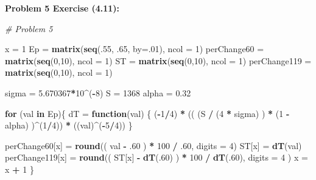 \documentclass[11pt]{article}
\newenvironment{problem}[1]{\textbf{Problem #1: }}{\newpage}
\newenvironment{Shaded}{\begin{snugshade}}{\end{snugshade}}
\newcommand{\CommentTok}[1]{\textcolor[rgb]{0.56,0.35,0.01}{\textit{#1}}}
\newcommand{\ControlFlowTok}[1]{\textcolor[rgb]{0.13,0.29,0.53}{\textbf{#1}}}
\newcommand{\DataTypeTok}[1]{\textcolor[rgb]{0.13,0.29,0.53}{#1}}
\newcommand{\DecValTok}[1]{\textcolor[rgb]{0.00,0.00,0.81}{#1}}
\newcommand{\FloatTok}[1]{\textcolor[rgb]{0.00,0.00,0.81}{#1}}
\newcommand{\KeywordTok}[1]{\textcolor[rgb]{0.13,0.29,0.53}{\textbf{#1}}}
\newcommand{\NormalTok}[1]{#1}
\newcommand{\OperatorTok}[1]{\textcolor[rgb]{0.81,0.36,0.00}{\textbf{#1}}}
\newcommand{\StringTok}[1]{\textcolor[rgb]{0.31,0.60,0.02}{#1}}
\begin{document}
\begin{problem}{5 Exercise (4.11)}
\begin{enumerate}[label = (\alph*)]
\begin{Shaded}
\begin{Highlighting}[]
\CommentTok{# Problem 5}

\NormalTok{x =}\StringTok{ }\DecValTok{1}
\NormalTok{Ep =}\StringTok{ }\KeywordTok{matrix}\NormalTok{(}\KeywordTok{seq}\NormalTok{(.}\DecValTok{55}\NormalTok{, }\FloatTok{.65}\NormalTok{, }\DataTypeTok{by=}\NormalTok{.}\DecValTok{01}\NormalTok{), }\DataTypeTok{ncol =} \DecValTok{1}\NormalTok{)}
\NormalTok{perChange60 =}\StringTok{ }\KeywordTok{matrix}\NormalTok{(}\KeywordTok{seq}\NormalTok{(}\DecValTok{0}\NormalTok{,}\DecValTok{10}\NormalTok{), }\DataTypeTok{ncol =} \DecValTok{1}\NormalTok{)}
\NormalTok{ST =}\StringTok{ }\KeywordTok{matrix}\NormalTok{(}\KeywordTok{seq}\NormalTok{(}\DecValTok{0}\NormalTok{,}\DecValTok{10}\NormalTok{), }\DataTypeTok{ncol =} \DecValTok{1}\NormalTok{)}
\NormalTok{perChange119 =}\StringTok{ }\KeywordTok{matrix}\NormalTok{(}\KeywordTok{seq}\NormalTok{(}\DecValTok{0}\NormalTok{,}\DecValTok{10}\NormalTok{), }\DataTypeTok{ncol =} \DecValTok{1}\NormalTok{)}

\NormalTok{sigma =}\StringTok{ }\FloatTok{5.670367}\OperatorTok{*}\DecValTok{10}\OperatorTok{^}\NormalTok{(}\OperatorTok{-}\DecValTok{8}\NormalTok{)}
\NormalTok{S =}\StringTok{ }\DecValTok{1368}
\NormalTok{alpha =}\StringTok{ }\FloatTok{0.32}

\ControlFlowTok{for}\NormalTok{ (val }\ControlFlowTok{in}\NormalTok{ Ep)\{}
\NormalTok{  dT =}\StringTok{ }\ControlFlowTok{function}\NormalTok{(val) \{ (}\OperatorTok{-}\DecValTok{1}\OperatorTok{/}\DecValTok{4}\NormalTok{) }\OperatorTok{*}\StringTok{ }\NormalTok{(( (S }\OperatorTok{/}\StringTok{ }\NormalTok{(}\DecValTok{4} \OperatorTok{*}\StringTok{ }\NormalTok{sigma) ) }\OperatorTok{*}\StringTok{ }\NormalTok{(}\DecValTok{1} \OperatorTok{-}\StringTok{ }\NormalTok{alpha) )}\OperatorTok{^}\NormalTok{(}\DecValTok{1}\OperatorTok{/}\DecValTok{4}\NormalTok{)) }\OperatorTok{*}\StringTok{ }\NormalTok{((val)}\OperatorTok{^}\NormalTok{(}\OperatorTok{-}\DecValTok{5}\OperatorTok{/}\DecValTok{4}\NormalTok{)) \}}

\NormalTok{  perChange60[x] =}\StringTok{ }\KeywordTok{round}\NormalTok{(( val }\OperatorTok{-}\StringTok{ }\FloatTok{.60}\NormalTok{ ) }\OperatorTok{*}\StringTok{ }\DecValTok{100} \OperatorTok{/}\StringTok{ }\FloatTok{.60}\NormalTok{, }\DataTypeTok{digits =} \DecValTok{4}\NormalTok{) }
\NormalTok{  ST[x] =}\StringTok{ }\KeywordTok{dT}\NormalTok{(val)}
\NormalTok{  perChange119[x] =}\StringTok{ }\KeywordTok{round}\NormalTok{(( ST[x] }\OperatorTok{-}\StringTok{ }\KeywordTok{dT}\NormalTok{(.}\DecValTok{60}\NormalTok{) ) }\OperatorTok{*}\StringTok{ }\DecValTok{100} \OperatorTok{/}\StringTok{ }\KeywordTok{dT}\NormalTok{(.}\DecValTok{60}\NormalTok{), }
\DataTypeTok{digits =} \DecValTok{4}\NormalTok{  ) }
\NormalTok{  x =}\StringTok{ }\NormalTok{x }\OperatorTok{+}\StringTok{ }\DecValTok{1}
\NormalTok{\}}


\end{Highlighting}
\end{Shaded}
\end{enumerate}
\end{problem}
\end{document}
